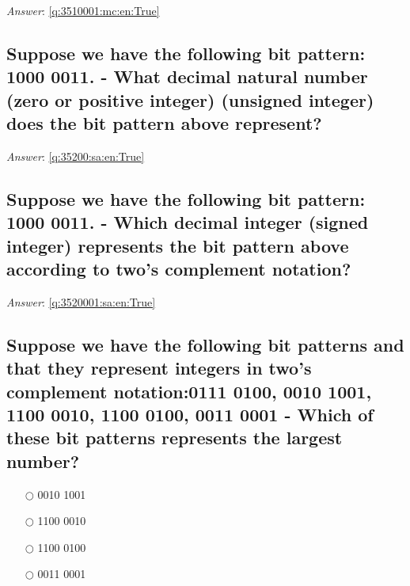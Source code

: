 \documentclass[a4paper,11pt,oneside]{article}
\begin{document}
\begin{sloppypar}
\vspace{1cm}

\textit{Answer}: \autoref{q:3510001:mc:en:True}



\subsection{Suppose we have the following bit pattern: 1000 0011. - What decimal natural number (zero or positive integer) (unsigned integer) does the bit pattern above represent?}

\label{q:35200:sa:en:False}

\vspace{2cm}

\noindent\makebox[\textwidth]{\hrulefill}

\vspace{1cm}

\textit{Answer}: \autoref{q:35200:sa:en:True}

\subsection{Suppose we have the following bit pattern: 1000 0011. - Which decimal integer (signed integer) represents the bit pattern above according to two's complement notation?}

\label{q:3520001:sa:en:False}

\vspace{2cm}

\noindent\makebox[\textwidth]{\hrulefill}

\vspace{1cm}

\textit{Answer}: \autoref{q:3520001:sa:en:True}



\subsection{Suppose we have the following bit patterns and that they represent integers in two's complement notation:0111 0100, 0010 1001, 1100 0010, 1100 0100, 0011 0001 - Which of these bit patterns represents the largest number?}

\label{q:35300:mc:en:False}

\begin{itemize}
  \item[$\bigcirc$] 0010 1001
  \item[$\bigcirc$] 1100 0010
  \item[$\bigcirc$] 1100 0100
  \item[$\bigcirc$] 0011 0001
\end{itemize}


\end{sloppypar}
\end{document}
